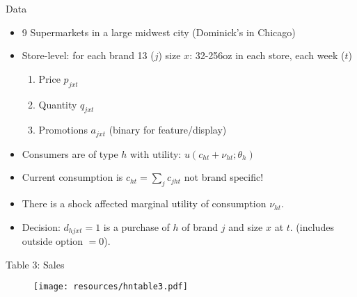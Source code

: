 \begin{frame}{Data}
\begin{itemize}
\item 9 Supermarkets in a large midwest city (Dominick's in Chicago)
\item Store-level: for each brand 13 ($j$) size $x$: 32-256oz in each store, each week ($t$)
\begin{enumerate}
\item Price $p_{jxt}$ 
\item Quantity $q_{jxt}$
\item Promotions $a_{jxt}$ (binary for feature/display)
\end{enumerate}
\item Consumers are of type $h$ with utility: $u(c_{ht} + \nu_{ht}; \theta_h)$
\item Current consumption is $c_{ht} = \sum_j c_{jht}$ \alert{not brand specific!}
\item There is a shock affected marginal utility of consumption $\nu_{ht}$.
\item Decision: $d_{hjxt} = 1$ is a purchase of $h$ of brand $j$ and size $x$ at $t$. (includes outside option $=0$).
\end{itemize}
\end{frame}

\begin{frame}{Table 3: Sales}
\begin{figure}[htbp]
\begin{center}
\texttt{[image: resources/hntable3.pdf]}
\label{gandr1}
\end{center}
\end{figure}
\end{frame}


